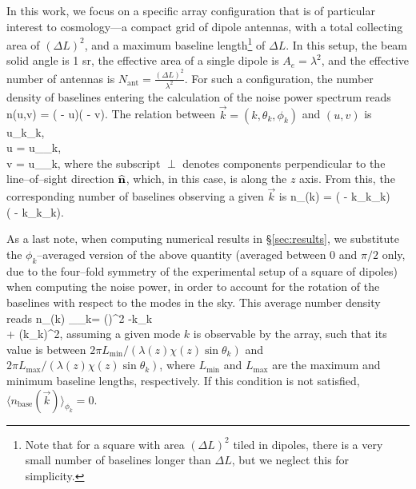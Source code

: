 In this work, we focus on a specific array configuration that is of particular interest to cosmology---a compact grid of dipole antennas, with a total collecting area of $(\Delta L)^2$, and a maximum baseline length\footnote{Note that for a square with area $(\Delta L)^2$ tiled in dipoles, there is a very small number of baselines longer than $\Delta L$, but we neglect this for simplicity.} of $\Delta L$. In this setup, the beam solid angle is 1 sr, the effective area of a single dipole is $A_e = \lambda^2$, and the effective number of antennas is $N_\text{ant} = \frac{(\Delta L)^2}{\lambda^2}$. For such a configuration, the number density of baselines entering the calculation of the noise power spectrum reads
\beq
n(u,v) = ( - u)( - v).
\label{eq:nuv_fftt}
\eeq
The relation between $\vec k=(k,\theta_k,\phi_k)$ and $(u,v)$ is
\beq
\bga
u_\perp \equiv {}k\sin\theta_k,\\
u = u_\perp \cos\phi_k,\\
v = u_\perp \sin\phi_k,
\ega
\label{eq:k_uv}
\eeq
where the subscript $\perp$ denotes components perpendicular to the line--of--sight direction ${\bf{\widehat n}}$, which, in this case, is along the $z$ axis. From this, the corresponding number of baselines observing a given $\vec k$ is
\beq
\bga
n_(\vec k) = ( - k\sin\theta_k\cos\phi_k)\\\times ( - k\sin\theta_k\sin\phi_k).
\ega
\label{eq:nk_fftt}
\eeq

As a last note, when computing numerical results in \S\ref{sec:results}, we substitute the $\phi_k$--averaged version of the above quantity (averaged between $0$ and $\pi/2$ only, due to the four--fold symmetry of the experimental setup of a square of dipoles) when computing the noise power, in order to account for the rotation of the baselines with respect to the modes in the sky. This average number density reads
\beq
\bga
\langle n_(\vec k) \rangle_{\phi_k}= \left(\right)^2 -k\sin\theta_k \\+ \left(k\sin\theta_k\right)^2,
\ega
\label{eq:nk_fftt_mean}
\eeq
assuming a given mode $k$ is observable by the array, such that its value is between $2\pi L_\text{min}/(\lambda(z)\chi(z)\sin\theta_k)$ and $2\pi L_\text{max}/(\lambda(z)\chi(z)\sin\theta_k)$, where $L_\text{min}$ and $L_\text{max}$ are the maximum and minimum baseline lengths, respectively. If this condition is not satisfied, $\langle n_\text{base}(\vec k) \rangle_{\phi_k}=0$.